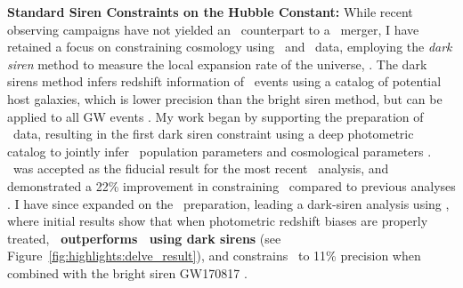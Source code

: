 \textbf{Standard Siren Constraints on the Hubble Constant:}
While recent observing campaigns have not yielded an \EM\ counterpart to a \GW\ merger, I have retained a focus on constraining cosmology using \EM\ and \GW\ data, employing the \textit{dark siren} method to measure the local expansion rate of the universe, \Ho. 
The dark sirens method infers redshift information of \GW\ events using a catalog of potential host galaxies, which is lower precision than the bright siren method, but can be applied to all GW events \cite{2023JCAP...12..023G}.
My work began by supporting the preparation of \DES\ data, resulting in the first dark siren constraint using a deep photometric catalog to jointly infer \GW\ population parameters and cosmological parameters \citep{McMahon2026DESY6H0}. \DES\ was accepted as the fiducial result for the most recent \LVK\ analysis, and demonstrated a 22\% improvement in constraining \Ho\ compared to previous analyses \citep{LVK2026GWTC5}. I have since expanded on the \DES\ preparation, leading a dark-siren analysis using \DELVE, where initial results show that when photometric redshift biases are properly treated, \textbf{\DELVE\ outperforms \DES\ using dark sirens} (see Figure~\ref{fig:highlights:delve_result}), and constrains \Ho\ to 11\% precision when combined with the bright siren GW170817 \cite{MacBride2026DELVEH0}. %
